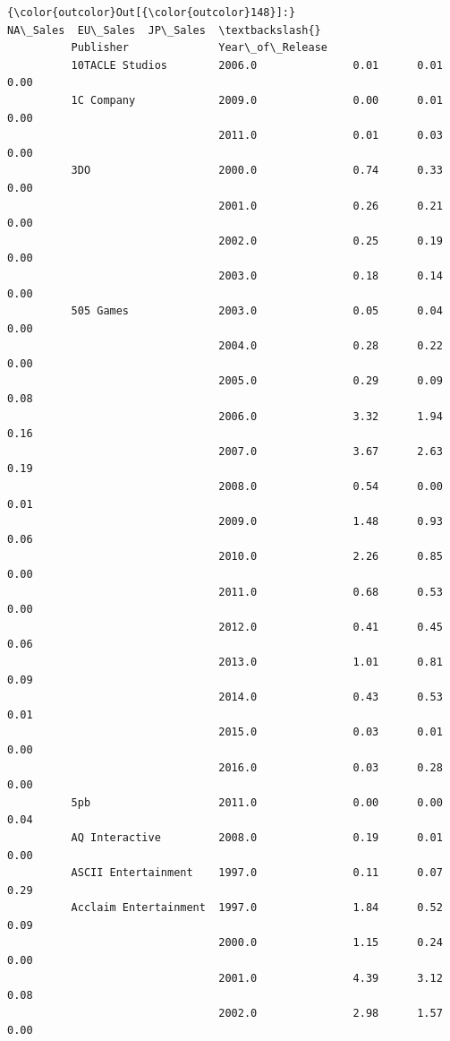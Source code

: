 \documentclass[11pt]{article}
\begin{document}
\begin{Verbatim}[commandchars=\\\{\}]
{\color{outcolor}Out[{\color{outcolor}148}]:}                                         NA\_Sales  EU\_Sales  JP\_Sales  \textbackslash{}
          Publisher              Year\_of\_Release                                 
          10TACLE Studios        2006.0               0.01      0.01      0.00   
          1C Company             2009.0               0.00      0.01      0.00   
                                 2011.0               0.01      0.03      0.00   
          3DO                    2000.0               0.74      0.33      0.00   
                                 2001.0               0.26      0.21      0.00   
                                 2002.0               0.25      0.19      0.00   
                                 2003.0               0.18      0.14      0.00   
          505 Games              2003.0               0.05      0.04      0.00   
                                 2004.0               0.28      0.22      0.00   
                                 2005.0               0.29      0.09      0.08   
                                 2006.0               3.32      1.94      0.16   
                                 2007.0               3.67      2.63      0.19   
                                 2008.0               0.54      0.00      0.01   
                                 2009.0               1.48      0.93      0.06   
                                 2010.0               2.26      0.85      0.00   
                                 2011.0               0.68      0.53      0.00   
                                 2012.0               0.41      0.45      0.06   
                                 2013.0               1.01      0.81      0.09   
                                 2014.0               0.43      0.53      0.01   
                                 2015.0               0.03      0.01      0.00   
                                 2016.0               0.03      0.28      0.00   
          5pb                    2011.0               0.00      0.00      0.04   
          AQ Interactive         2008.0               0.19      0.01      0.00   
          ASCII Entertainment    1997.0               0.11      0.07      0.29   
          Acclaim Entertainment  1997.0               1.84      0.52      0.09   
                                 2000.0               1.15      0.24      0.00   
                                 2001.0               4.39      3.12      0.08   
                                 2002.0               2.98      1.57      0.00   

\end{Verbatim}
\end{document}
